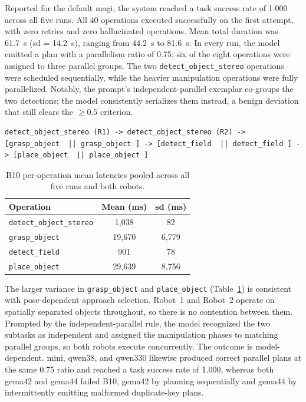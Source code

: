Reported for the default \gls{magi}, the system reached a task success rate of 1.000 across all five runs. All 40 operations executed successfully on the first attempt, with zero retries and zero hallucinated operations. Mean total duration was 61.7~s (\gls{sd} = 14.2~s), ranging from 44.2~s to 81.6~s. In every run, the model emitted a plan with a parallelism ratio of 0.75; six of the eight operations were assigned to three parallel groups. The two \texttt{detect\_object\_stereo} operations were scheduled sequentially, while the heavier manipulation operations were fully parallelized. Notably, the prompt’s independent-parallel exemplar co-groups the two detections; the model consistently serializes them instead, a benign deviation that still clears the $\geq 0.5$ criterion.

\begin{lstlisting}
detect_object_stereo (R1) -> detect_object_stereo (R2) -> [grasp_object  || grasp_object ] -> [detect_field  || detect_field ] -> [place_object  || place_object ]
\end{lstlisting}

\begin{table}[t]
	\centering
	\begin{tabular}{lcc}
		\hline
		\textbf{Operation}              & \textbf{Mean (ms)} & \textbf{\gls{sd} (ms)} \\
		\hline
		\texttt{detect\_object\_stereo} & 1{,}038            & 82                     \\
		\texttt{grasp\_object}          & 19{,}670           & 6{,}779                \\
		\texttt{detect\_field}          & 901                & 78                     \\
		\texttt{place\_object}          & 29{,}639           & 8{,}756                \\
		\hline
	\end{tabular}
	\caption{B10 per-operation mean latencies pooled across all five runs and both robots.}
	\label{tab:b10-latency}
\end{table}

The larger variance in \texttt{grasp\_object} and \texttt{place\_object} (Table~\ref{tab:b10-latency}) is consistent with pose-dependent approach selection. Robot~1 and Robot~2 operate on spatially separated objects throughout, so there is no contention between them. Prompted by the independent-parallel rule, the model recognized the two subtasks as independent and assigned the manipulation phases to matching parallel groups, so both robots execute concurrently. The outcome is model-dependent. \gls{mini}, \gls{qwen38}, and \gls{qwen330} likewise produced correct parallel plans at the same 0.75 ratio and reached a task success rate of 1.000, whereas both \gls{gema42} and \gls{gema44} failed B10, \gls{gema42} by planning sequentially and \gls{gema44} by intermittently emitting malformed duplicate-key plans.

